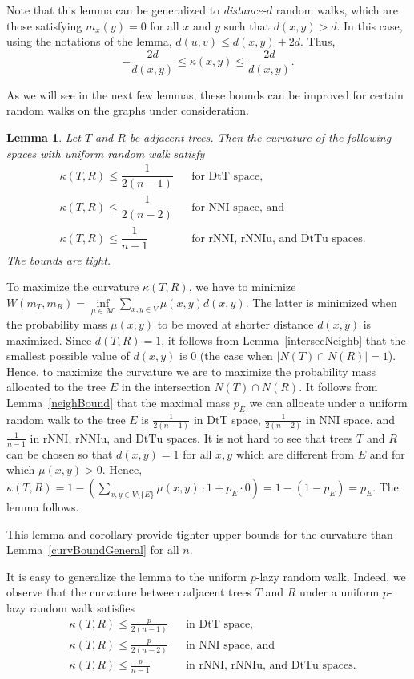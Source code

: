 \documentclass{amsart}
\newtheorem{lemma}{Lemma}
\theoremstyle{definition}
\newcommand{\nni}{\mathrm{NNI}}
\newcommand{\rnni}{\mathrm{rNNI}}
\newcommand{\rnniu}{\mathrm{rNNIu}}
\newcommand{\mdts}{\mathrm{DtT}}
\newcommand{\mdtsu}{\mathrm{DtTu}}
\newcommand{\M}{\mathcal{M}}
\begin{document}
Note that this lemma can be generalized to {\em distance-$d$} random walks, which are those satisfying $m_x(y) = 0$ for all $x$ and $y$ such that $d(x,y) > d$.
In this case, using the notations of the lemma, $d(u,v) \leq d(x,y) + 2d$.
Thus,
\[
-\dfrac{2d}{d(x,y)} \leq \kappa(x,y) \leq \dfrac{2d}{d(x,y)}.
\]

As we will see in the next few lemmas, these bounds can be improved for certain random walks on the graphs under consideration.

\begin{lemma}\label{uniformUpper}
Let $T$ and $R$ be adjacent trees.
Then the curvature of the following spaces with uniform random walk satisfy
\begin{align*}
& \kappa(T,R) \leq \dfrac{1}{2(n-1)}	&& \mbox{for $\mdts$ space,}\\
& \kappa(T,R) \leq \dfrac{1}{2(n-2)}	&& \mbox{for $\nni$ space, and}\\
& \kappa(T,R) \leq \dfrac{1}{n-1}	&& \mbox{for $\rnni$, $\rnniu$, and $\mdtsu$ spaces.}
\end{align*}
The bounds are tight.
\end{lemma}

\proof
To maximize the curvature $\kappa(T,R)$, we have to minimize $W(m_T,m_R) = \inf\limits_{\mu\in\M} \sum\limits_{x,y\in V}\mu(x,y) d(x,y)$.
The latter is minimized when the probability mass $\mu(x,y)$ to be moved at shorter distance $d(x,y)$ is maximized.
Since $d(T,R) = 1$, it follows from Lemma~\ref{intersecNeighb} that the smallest possible value of $d(x,y)$ is $0$ (the case when $|N(T) \cap N(R)| = 1$).
Hence, to maximize the curvature we are to maximize the probability mass allocated to the tree $E$ in the intersection $N(T) \cap N(R)$.
It follows from Lemma~\ref{neighBound} that the maximal mass $p_E$ we can allocate under a uniform random walk to the tree $E$ is $\frac{1}{2(n-1)}$ in $\mdts$ space, $\frac{1}{2(n-2)}$ in $\nni$ space, and $\frac{1}{n-1}$ in $\rnni$, $\rnniu$, and $\mdtsu$ spaces.
It is not hard to see that trees $T$ and $R$ can be chosen so that $d(x,y) = 1$ for all $x,y$ which are different from $E$ and for which $\mu(x,y) > 0$.
Hence, $\kappa(T, R) = 1 - \left(\sum\limits_{x,y\in V\setminus\{E\}}\mu(x,y)\cdot 1 + p_E \cdot 0\right) = 1 - (1-p_E) = p_E$.
The lemma follows.
\endproof

This lemma and corollary provide tighter upper bounds for the curvature than Lemma~\ref{curvBoundGeneral} for all $n$.

It is easy to generalize the lemma to the uniform $p$-lazy random walk.
Indeed, we observe that the curvature between adjacent trees $T$ and $R$ under a uniform $p$-lazy random walk satisfies
\begin{align*}
& \kappa(T,R) \leq \frac{p}{2(n-1)}	&& \mbox{in $\mdts$ space,}\\
& \kappa(T,R) \leq \frac{p}{2(n-2)}	&& \mbox{in $\nni$ space, and}\\
& \kappa(T,R) \leq \frac{p}{n-1}		&& \mbox{in $\rnni$, $\rnniu$, and $\mdtsu$ spaces.}
\end{align*}
\end{document}
